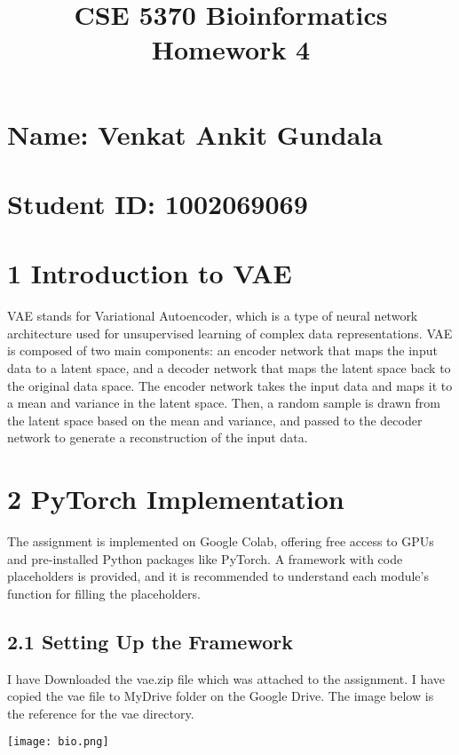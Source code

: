\documentclass{article}
\title{\textbf{CSE 5370 Bioinformatics Homework 4}}
\date{}
\begin{document}
\maketitle
\section*{Name: Venkat Ankit Gundala}
\section*{Student ID: 1002069069}\bigskip


\section*{1 Introduction to VAE}
\newline VAE stands for Variational Autoencoder, which is a type of neural network architecture used for unsupervised learning of complex data representations.
\newline VAE is composed of two main components: an encoder network that maps the input data to a latent space, and a decoder network that maps the latent space back to the original data space. The encoder network takes the input data and maps it to a mean and variance in the latent space. Then, a random sample is drawn from the latent space based on the mean and variance, and passed to the decoder network to generate a reconstruction of the input data.

\section*{2 PyTorch Implementation}
\newline The assignment is implemented on Google Colab, offering free access to GPUs and pre-installed Python packages like PyTorch. A framework with code placeholders is provided, and it is recommended to understand each module's function for filling the placeholders.
  \subsection*{2.1 Setting Up the Framework}
  
\newline I have Downloaded the vae.zip file which was attached to the assignment. I have copied the vae file to MyDrive folder on the Google Drive. The image below is the reference for the vae directory.


\texttt{[image: bio.png]}
\end{document}

